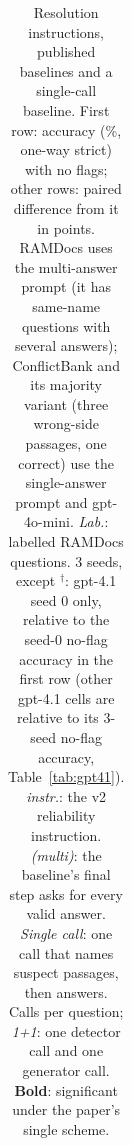 \begin{table}[t]
{\begin{tabular}{lrrrrrrrrrr}
\bottomrule
\end{tabular}}
\caption{Resolution instructions, published baselines and a single-call baseline. First row: accuracy (\%, one-way
strict) with no flags; other rows: paired difference from it in points. RAMDocs uses the multi-answer prompt (it has
same-name questions with several answers); ConflictBank and its majority variant (three wrong-side passages, one
correct) use the single-answer prompt and gpt-4o-mini. \emph{Lab.}: labelled RAMDocs questions. 3 seeds, except
$^\dagger$: gpt-4.1 seed 0 only, relative to the seed-0 no-flag accuracy in the first row (other gpt-4.1 cells are
relative to its 3-seed no-flag accuracy, Table~\ref{tab:gpt41}). \emph{instr.}: the v2 reliability instruction. \emph{(multi)}: the baseline's final
step asks for every valid answer. \emph{Single call}: one call that names suspect passages, then answers. Calls per
question; \emph{1+1}: one detector call and one generator call. \textbf{Bold}: significant under the paper's single
scheme.}
\label{tab:baselines}
\end{table}
